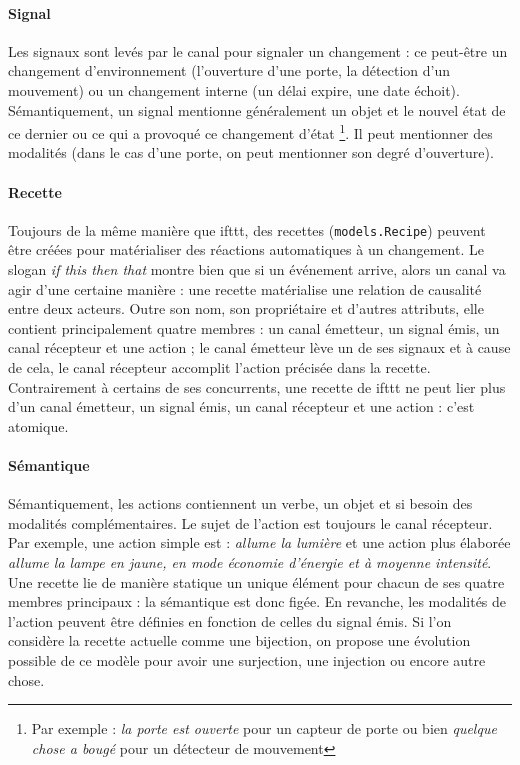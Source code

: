 \documentclass[11pt]{article}
\begin{document}
\paragraph{Signal} Les signaux sont levés par le canal pour signaler un changement : ce peut-être un changement d'environnement (l'ouverture d'une porte, la détection d'un mouvement) ou un changement interne (un délai expire, une date échoit). Sémantiquement, un signal mentionne généralement un objet et le nouvel état de ce dernier ou ce qui a provoqué ce changement d'état \footnote{Par exemple : \textsl{la porte est ouverte} pour un capteur de porte ou bien \textsl{quelque chose a bougé} pour un détecteur de mouvement}. Il peut mentionner des modalités (dans le cas d'une porte, on peut mentionner son degré d'ouverture).

\paragraph{Recette} Toujours de la même manière que ifttt, des recettes (\texttt{models.Recipe}) peuvent être créées pour matérialiser des réactions automatiques à un changement. Le slogan \textsl{if this then that} montre bien que si un événement arrive, alors un canal va agir d'une certaine manière : une recette matérialise une relation de causalité entre deux acteurs. Outre son nom, son propriétaire et d'autres attributs, elle contient principalement quatre membres : un canal émetteur, un signal émis, un canal récepteur et une action ; le canal émetteur lève un de ses signaux et à cause de cela, le canal récepteur accomplit l'action précisée dans la recette. Contrairement à certains de ses concurrents, une recette de ifttt ne peut lier plus d'un canal émetteur, un signal émis, un canal récepteur et une action : c'est atomique.

\paragraph{Sémantique} Sémantiquement, les actions contiennent un verbe, un objet et si besoin des modalités complémentaires. Le sujet de l'action est toujours le canal récepteur. Par exemple, une action simple est : \textsl{allume la lumière} et une action plus élaborée \textsl{allume la lampe en jaune, en mode économie d'énergie et à moyenne intensité}. Une recette lie de manière statique un unique élément pour chacun de ses quatre membres principaux : la sémantique est donc figée. En revanche, les modalités de l'action peuvent être définies en fonction de celles du signal émis. Si l'on considère la recette actuelle comme une bijection, on propose une évolution possible de ce modèle pour avoir une surjection, une injection ou encore autre chose.
\end{document}
